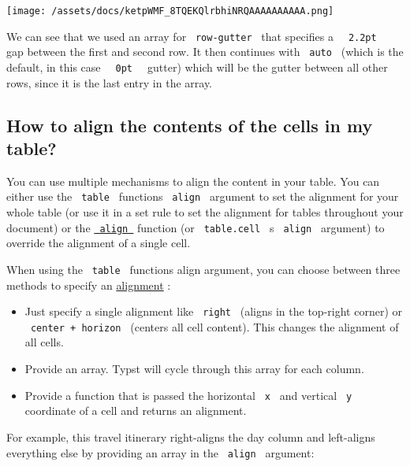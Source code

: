\texttt{[image: /assets/docs/ketpWMF\_8TQEKQlrbhiNRQAAAAAAAAAA.png]}

We can see that we used an array for \texttt{\ row-gutter\ } that
specifies a \texttt{\ }{\texttt{\ 2.2pt\ }}\texttt{\ } gap between the
first and second row. It then continues with \texttt{\ auto\ } (which is
the default, in this case \texttt{\ }{\texttt{\ 0pt\ }}\texttt{\ }
gutter) which will be the gutter between all other rows, since it is the
last entry in the array.

\subsection{How to align the contents of the cells in my
table?}\label{alignment}

You can use multiple mechanisms to align the content in your table. You
can either use the \texttt{\ table\ } function\textquotesingle s
\texttt{\ align\ } argument to set the alignment for your whole table
(or use it in a set rule to set the alignment for tables throughout your
document) or the
\href{/docs/reference/layout/align/}{\texttt{\ align\ }} function (or
\texttt{\ table.cell\ } \textquotesingle s \texttt{\ align\ } argument)
to override the alignment of a single cell.

When using the \texttt{\ table\ } function\textquotesingle s align
argument, you can choose between three methods to specify an
\href{/docs/reference/layout/alignment/}{alignment} :

\begin{itemize}
\tightlist
\item
  Just specify a single alignment like \texttt{\ right\ } (aligns in the
  top-right corner) or \texttt{\ center\ +\ horizon\ } (centers all cell
  content). This changes the alignment of all cells.
\item
  Provide an array. Typst will cycle through this array for each column.
\item
  Provide a function that is passed the horizontal \texttt{\ x\ } and
  vertical \texttt{\ y\ } coordinate of a cell and returns an alignment.
\end{itemize}

For example, this travel itinerary right-aligns the day column and
left-aligns everything else by providing an array in the
\texttt{\ align\ } argument:

